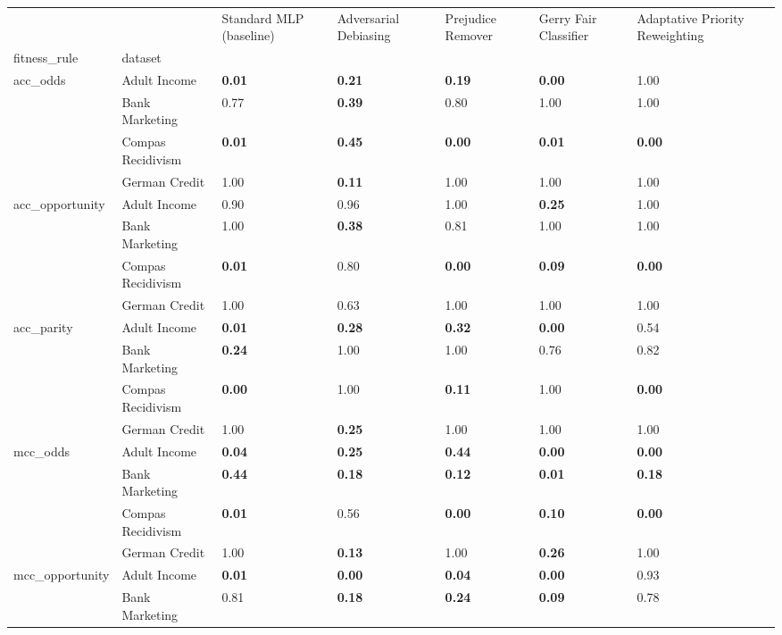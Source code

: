 \begin{tabular}{lllllll}
\toprule
 &  & Standard MLP (baseline) & Adversarial Debiasing & Prejudice Remover & Gerry Fair Classifier & Adaptative Priority Reweighting \\
fitness_rule & dataset &  &  &  &  &  \\
\midrule
\multirow[t]{4}{*}{acc_odds} & Adult Income & \textbf{0.01} & \textbf{0.21} & \textbf{0.19} & \textbf{0.00} & 1.00 \\
 & Bank Marketing & 0.77 & \textbf{0.39} & 0.80 & 1.00 & 1.00 \\
 & Compas Recidivism & \textbf{0.01} & \textbf{0.45} & \textbf{0.00} & \textbf{0.01} & \textbf{0.00} \\
 & German Credit & 1.00 & \textbf{0.11} & 1.00 & 1.00 & 1.00 \\
\cline{1-7}
\multirow[t]{4}{*}{acc_opportunity} & Adult Income & 0.90 & 0.96 & 1.00 & \textbf{0.25} & 1.00 \\
 & Bank Marketing & 1.00 & \textbf{0.38} & 0.81 & 1.00 & 1.00 \\
 & Compas Recidivism & \textbf{0.01} & 0.80 & \textbf{0.00} & \textbf{0.09} & \textbf{0.00} \\
 & German Credit & 1.00 & 0.63 & 1.00 & 1.00 & 1.00 \\
\cline{1-7}
\multirow[t]{4}{*}{acc_parity} & Adult Income & \textbf{0.01} & \textbf{0.28} & \textbf{0.32} & \textbf{0.00} & 0.54 \\
 & Bank Marketing & \textbf{0.24} & 1.00 & 1.00 & 0.76 & 0.82 \\
 & Compas Recidivism & \textbf{0.00} & 1.00 & \textbf{0.11} & 1.00 & \textbf{0.00} \\
 & German Credit & 1.00 & \textbf{0.25} & 1.00 & 1.00 & 1.00 \\
\cline{1-7}
\multirow[t]{4}{*}{mcc_odds} & Adult Income & \textbf{0.04} & \textbf{0.25} & \textbf{0.44} & \textbf{0.00} & \textbf{0.00} \\
 & Bank Marketing & \textbf{0.44} & \textbf{0.18} & \textbf{0.12} & \textbf{0.01} & \textbf{0.18} \\
 & Compas Recidivism & \textbf{0.01} & 0.56 & \textbf{0.00} & \textbf{0.10} & \textbf{0.00} \\
 & German Credit & 1.00 & \textbf{0.13} & 1.00 & \textbf{0.26} & 1.00 \\
\cline{1-7}
\multirow[t]{4}{*}{mcc_opportunity} & Adult Income & \textbf{0.01} & \textbf{0.00} & \textbf{0.04} & \textbf{0.00} & 0.93 \\
 & Bank Marketing & 0.81 & \textbf{0.18} & \textbf{0.24} & \textbf{0.09} & 0.78 \\

\end{tabular}

